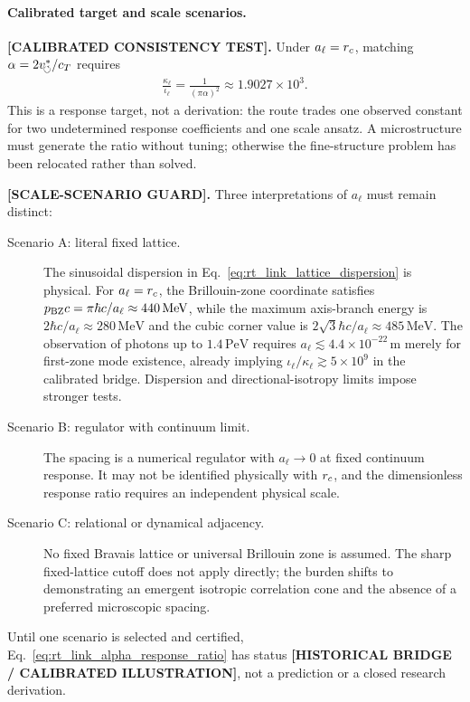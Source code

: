 \paragraph{Calibrated target and scale scenarios.}
\textbf{[CALIBRATED CONSISTENCY TEST].}
Under \(a_\ell=r_c\), matching \(\alpha=2v_{\!\boldsymbol{\circlearrowleft}}^{\ast}/c_T\) requires
\begin{align}
    \frac{\kappa_\ell}{\iota_\ell}
    =
    \frac{1}{(\pi\alpha)^2}
    \approx
    1.9027\times10^3.
    \label{eq:rt_link_alpha_ratio_target}
\end{align}
This is a response target, not a derivation: the route trades one observed
constant for two undetermined response coefficients and one scale ansatz.  A
microstructure must generate the ratio without tuning; otherwise the
fine-structure problem has been relocated rather than solved.

\textbf{[SCALE-SCENARIO GUARD].}
Three interpretations of \(a_\ell\) must remain distinct:
\begin{description}
    \item[Scenario A: literal fixed lattice.] The sinusoidal dispersion in
    Eq.~\eqref{eq:rt_link_lattice_dispersion} is physical.  For
    \(a_\ell=r_c\), the Brillouin-zone coordinate satisfies
    \(p_{\rm BZ}c=\pi\hbar c/a_\ell\approx440\,\mathrm{MeV}\), while the
    maximum axis-branch energy is
    \(2\hbar c/a_\ell\approx280\,\mathrm{MeV}\) and the cubic corner value is
    \(2\sqrt3\hbar c/a_\ell\approx485\,\mathrm{MeV}\).  The observation of
    photons up to \(1.4\,\mathrm{PeV}\) \cite{LHAASO2021PeV} requires
    \(a_\ell\lesssim4.4\times10^{-22}\,\mathrm m\) merely for first-zone mode
    existence, already implying \(\iota_\ell/\kappa_\ell\gtrsim5\times10^9\)
    in the calibrated bridge.  Dispersion and directional-isotropy limits impose
    stronger tests.
    \item[Scenario B: regulator with continuum limit.] The spacing is a numerical
    regulator with \(a_\ell\to0\) at fixed continuum response.  It may not be
    identified physically with \(r_c\), and the dimensionless response ratio
    requires an independent physical scale.
    \item[Scenario C: relational or dynamical adjacency.] No fixed Bravais lattice
    or universal Brillouin zone is assumed.  The sharp fixed-lattice cutoff does
    not apply directly; the burden shifts to demonstrating an emergent isotropic
    correlation cone and the absence of a preferred microscopic spacing.
\end{description}
Until one scenario is selected and certified,
Eq.~\eqref{eq:rt_link_alpha_response_ratio} has status
\textbf{[HISTORICAL BRIDGE / CALIBRATED ILLUSTRATION]}, not a prediction or a
closed research derivation.

